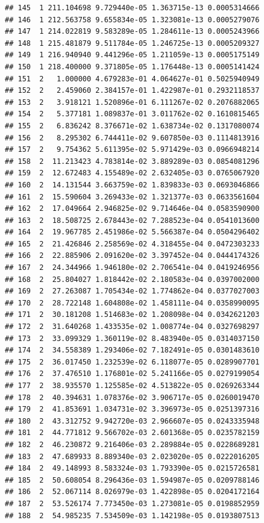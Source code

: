 \documentclass[article]{jss}\usepackage[]{graphicx}\usepackage[]{xcolor}
\makeatletter
\newenvironment{kframe}{%
 \def\at@end@of@kframe{}%
 \ifinner\ifhmode%
  \def\at@end@of@kframe{\end{minipage}}%
  \begin{minipage}{\columnwidth}%
 \fi\fi%
 \def\FrameCommand##1{\hskip\@totalleftmargin \hskip-\fboxsep
 \colorbox{shadecolor}{##1}\hskip-\fboxsep
     \hskip-\linewidth \hskip-\@totalleftmargin \hskip\columnwidth}%
 \MakeFramed {\advance\hsize-\width
   \@totalleftmargin\z@ \linewidth\hsize
   \@setminipage}}%
 {\par\unskip\endMakeFramed%
 \at@end@of@kframe}
\newenvironment{knitrout}{}{} %
\makeatother
\begin{document}
\begin{knitrout}
\begin{kframe}
\begin{verbatim}
## 145  1 211.104698 9.729440e-05 1.363715e-13 0.0005314666
## 146  1 212.563758 9.655834e-05 1.323081e-13 0.0005279076
## 147  1 214.022819 9.583289e-05 1.284611e-13 0.0005243966
## 148  1 215.481879 9.511784e-05 1.246725e-13 0.0005209327
## 149  1 216.940940 9.441296e-05 1.211059e-13 0.0005175149
## 150  1 218.400000 9.371805e-05 1.176448e-13 0.0005141424
## 151  2   1.000000 4.679283e-01 4.064627e-01 0.5025940949
## 152  2   2.459060 2.384157e-01 1.422987e-01 0.2932118537
## 153  2   3.918121 1.520896e-01 6.111267e-02 0.2076882065
## 154  2   5.377181 1.089837e-01 3.011762e-02 0.1610815465
## 155  2   6.836242 8.376671e-02 1.638734e-02 0.1317080074
## 156  2   8.295302 6.744411e-02 9.607850e-03 0.1114813916
## 157  2   9.754362 5.611395e-02 5.971429e-03 0.0966948214
## 158  2  11.213423 4.783814e-02 3.889289e-03 0.0854081296
## 159  2  12.672483 4.155489e-02 2.632405e-03 0.0765067920
## 160  2  14.131544 3.663759e-02 1.839833e-03 0.0693046866
## 161  2  15.590604 3.269433e-02 1.321377e-03 0.0633561604
## 162  2  17.049664 2.946825e-02 9.714646e-04 0.0583590900
## 163  2  18.508725 2.678443e-02 7.288523e-04 0.0541013600
## 164  2  19.967785 2.451986e-02 5.566387e-04 0.0504296402
## 165  2  21.426846 2.258569e-02 4.318455e-04 0.0472303233
## 166  2  22.885906 2.091620e-02 3.397452e-04 0.0444174326
## 167  2  24.344966 1.946180e-02 2.706541e-04 0.0419246956
## 168  2  25.804027 1.818442e-02 2.180583e-04 0.0397002000
## 169  2  27.263087 1.705434e-02 1.774862e-04 0.0377027003
## 170  2  28.722148 1.604808e-02 1.458111e-04 0.0358990095
## 171  2  30.181208 1.514683e-02 1.208098e-04 0.0342621203
## 172  2  31.640268 1.433535e-02 1.008774e-04 0.0327698297
## 173  2  33.099329 1.360119e-02 8.483940e-05 0.0314037150
## 174  2  34.558389 1.293406e-02 7.182491e-05 0.0301483610
## 175  2  36.017450 1.232539e-02 6.118077e-05 0.0289907701
## 176  2  37.476510 1.176801e-02 5.241166e-05 0.0279199054
## 177  2  38.935570 1.125585e-02 4.513822e-05 0.0269263344
## 178  2  40.394631 1.078376e-02 3.906717e-05 0.0260019470
## 179  2  41.853691 1.034731e-02 3.396973e-05 0.0251397316
## 180  2  43.312752 9.942720e-03 2.966607e-05 0.0243335948
## 181  2  44.771812 9.566702e-03 2.601368e-05 0.0235782159
## 182  2  46.230872 9.216406e-03 2.289884e-05 0.0228689281
## 183  2  47.689933 8.889340e-03 2.023020e-05 0.0222016205
## 184  2  49.148993 8.583324e-03 1.793390e-05 0.0215726581
## 185  2  50.608054 8.296436e-03 1.594987e-05 0.0209788146
## 186  2  52.067114 8.026979e-03 1.422898e-05 0.0204172164
## 187  2  53.526174 7.773450e-03 1.273081e-05 0.0198852959
## 188  2  54.985235 7.534509e-03 1.142198e-05 0.0193807513

\end{verbatim}
\end{kframe}
\end{knitrout}
\end{document}
